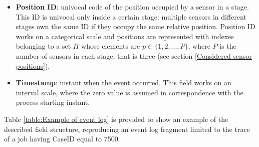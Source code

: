 \begin{itemize}
\item \textbf{Position ID}: univocal code of the position occupied by a sensor in a stage. This ID is univocal only inside a certain stage: multiple sensors in different stages own the same ID if they occupy the same relative position. Position ID works on a categorical scale and positions are represented with indexes belonging to a set $\Pi$ whose elements are $p\in\{1,2,...,P\}$, where $P$ is the number of sensors in each stage, that is three (see section \ref{Considered sensor positions}).
\item \textbf{Timestamp}: instant when the event occurred. This field works on an interval scale, where the zero value is assumed in correspondence with the process starting instant. 
\end{itemize}
\begin{table}[H]
\caption{Example of event log generated by sensors embedded in a production line}
\centering
\label{table:Example of event log}
\end{table}
Table \ref{table:Example of event log} is provided to show an example of the described field structure, reproducing an event log fragment limited to the trace of a job having CaseID equal to 7500. 
